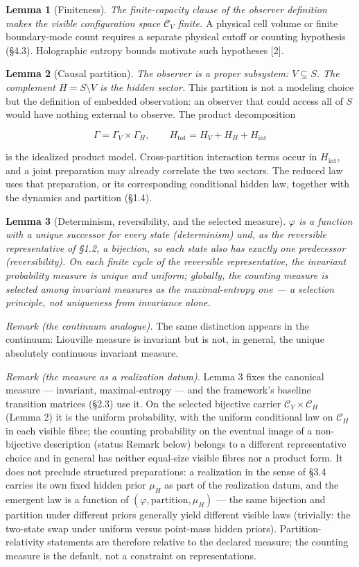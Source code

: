 \documentclass[
]{article}
\begin{document}
\textbf{Lemma 1} (Finiteness). \emph{The finite-capacity clause of the
observer definition makes the visible configuration space
\(\mathcal{C}_V\) finite.} A physical cell volume or finite
boundary-mode count requires a separate physical cutoff or counting
hypothesis (§4.3). Holographic entropy bounds motivate such hypotheses
{[}2{]}.

\textbf{Lemma 2} (Causal partition). \emph{The observer is a proper
subsystem: \(V \subsetneq S\). The complement \(H = S \setminus V\) is
the hidden sector.} This partition is not a modeling choice but the
definition of embedded observation: an observer that could access all of
\(S\) would have nothing external to observe. The product decomposition

\[\Gamma = \Gamma_V \times \Gamma_H, \qquad H_{\text{tot}} = H_V + H_H + H_{\text{int}}\]

is the idealized product model. Cross-partition interaction terms occur
in \(H_{\text{int}}\), and a joint preparation may already correlate the
two sectors. The reduced law uses that preparation, or its corresponding
conditional hidden law, together with the dynamics and partition (§1.4).

\textbf{Lemma 3} (Determinism, reversibility, and the selected measure).
\emph{\(\varphi\) is a function with a unique successor for every state
(determinism) and, as the reversible representative of §1.2, a
bijection, so each state also has exactly one predecessor
(reversibility). On each finite cycle of the reversible representative,
the invariant probability measure is unique and uniform; globally, the
counting measure is selected among invariant measures as the
maximal-entropy one --- a selection principle, not uniqueness from
invariance alone.}

\emph{Remark (the continuum analogue).} The same distinction appears in
the continuum: Liouville measure is invariant but is not, in general,
the unique absolutely continuous invariant measure.

\emph{Remark (the measure as a realization datum).} Lemma 3 fixes the
canonical measure --- invariant, maximal-entropy --- and the framework's
baseline transition matrices (§2.3) use it. On the selected bijective
carrier \(\mathcal{C}_V \times \mathcal{C}_H\) (Lemma 2) it is the
uniform probability, with the uniform conditional law on
\(\mathcal{C}_H\) in each visible fibre; the counting probability on the
eventual image of a non-bijective description (status Remark below)
belongs to a different representative choice and in general has neither
equal-size visible fibres nor a product form. It does not preclude
structured preparations: a realization in the sense of §3.4 carries its
own fixed hidden prior \(\mu_H\) as part of the realization datum, and
the emergent law is a function of \((\varphi, \text{partition}, \mu_H)\)
--- the same bijection and partition under different priors generally
yield different visible laws (trivially: the two-state swap under
uniform versus point-mass hidden priors). Partition-relativity
statements are therefore relative to the declared measure; the counting
measure is the default, not a constraint on representations.
\end{document}
